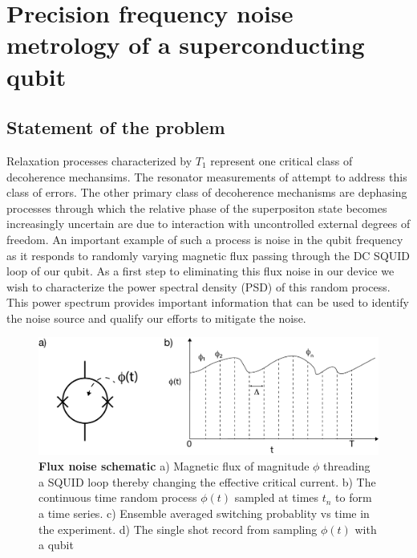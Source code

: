 \chapter{Precision frequency noise metrology of a superconducting qubit}
\label{ch:noise}

\section{Statement of the problem}
Relaxation processes characterized by $T_1$ represent one critical class of decoherence mechansims.
The resonator measurements of  attempt to address this class of errors.
The other primary class of decoherence mechanisms are dephasing processes through which the relative phase of the superpositon state becomes increasingly uncertain are due to interaction with uncontrolled external degrees of freedom.
An important example of such a process is noise in the qubit frequency as it responds to randomly varying magnetic flux passing through the DC SQUID loop of our qubit.
As a first step to eliminating this flux noise in our device we wish to characterize the power spectral density (PSD) of this random process.
This power spectrum provides important information that can be used to identify the noise source and qualify our efforts to mitigate the noise.
\begin{figure}[h]
    \begin{center}
        \includegraphics[width=150mm]{./PDF/flux_noise_schematic_191007_212p.pdf}
    \end{center}
    \caption{\textbf{Flux noise schematic}
    a) Magnetic flux of magnitude $\phi$ threading a SQUID loop thereby changing the effective critical current.
    b) The continuous time random process $\phi (t)$ sampled at times $t_n$ to form a time series.
    c) Ensemble averaged switching probablity vs time in the experiment.
    d) The single shot record from sampling $\phi (t)$ with a qubit}
    \label{Averaging_window_size}
\end{figure}

